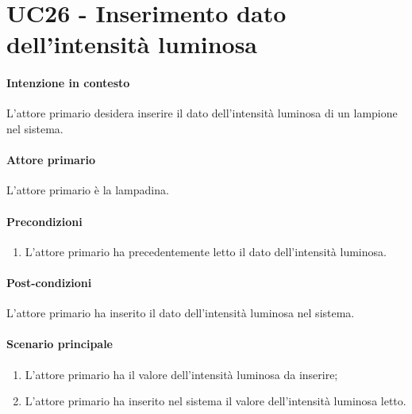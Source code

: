 \section{UC26 - Inserimento dato dell'intensità luminosa}\label{uc:26}
\paragraph{Intenzione in contesto} L'attore primario desidera inserire il dato dell'intensità luminosa di un lampione nel sistema.
\paragraph{Attore primario} L'attore primario è la lampadina.
\paragraph{Precondizioni}  
\begin{enumerate}
    \item L'attore primario ha precedentemente letto il dato dell'intensità luminosa.
\end{enumerate}
\paragraph{Post-condizioni} L'attore primario ha inserito il dato dell'intensità luminosa nel sistema.
\paragraph{Scenario principale}
\begin{enumerate}
    \item L'attore primario ha il valore dell'intensità luminosa da inserire;
    \item L'attore primario ha inserito nel sistema il valore dell'intensità luminosa letto.
\end{enumerate}